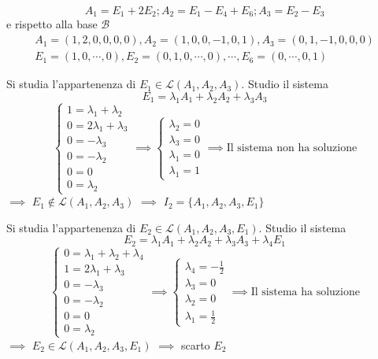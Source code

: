 {\[
A_1=E_1+2E_2; A_2=E_1-E_4+E_6; A_3=E_2-E_3
\]
e rispetto alla base $\mathscr{B}$
\[\begin{gathered}
A_1=(1, 2, 0, 0, 0, 0), A_2=(1, 0, 0, -1, 0, 1), A_3=(0, 1, -1, 0, 0, 0)\\
E_1=(1, 0, \cdots, 0), E_2=(0, 1, 0, \cdots, 0), \cdots, E_6=(0, \cdots, 0, 1)
\end{gathered}\]

Si studia l'appartenenza di $E_1\in\mathscr{L}(A_1, A_2, A_3)$. Studio il sistema
\[
E_1=\lambda_1 A_1 + \lambda_2 A_2+ \lambda_3A_3
\]
\[
\begin{cases}
1=\lambda_1+\lambda_2\\
0=2\lambda_1+\lambda_3\\
0=-\lambda_3\\
0=-\lambda_2\\
0=0\\
0=\lambda_2
\end{cases}\implies \begin{cases}
\lambda_2=0\\
\lambda_3=0\\
\lambda_1=0\\
\lambda_1=1
\end{cases}\implies\text{Il sistema non ha soluzione}
\]$\implies$ $E_1\notin\mathscr{L}(A_1, A_2, A_3)$ $\implies$ $I_2=\{A_1, A_2, A_3, E_1\}$

Si studia l'appartenenza di $E_2\in\mathscr{L}(A_1, A_2, A_3, E_1)$. Studio il sistema
\[
E_2=\lambda_1 A_1 + \lambda_2 A_2+ \lambda_3A_3+\lambda_4E_1
\]
\[
\begin{cases}
0=\lambda_1+\lambda_2+\lambda_4\\
1=2\lambda_1+\lambda_3\\
0=-\lambda_3\\
0=-\lambda_2\\
0=0\\
0=\lambda_2
\end{cases}\implies \begin{cases}
\lambda_4=-\frac{1}{2}\\
\lambda_3=0\\
\lambda_2=0\\
\lambda_1=\frac{1}{2}
\end{cases}\implies\text{Il sistema ha soluzione}
\]$\implies$ $E_2\in\mathscr{L}(A_1, A_2, A_3, E_1)$ $\implies$ scarto $E_2$

}
